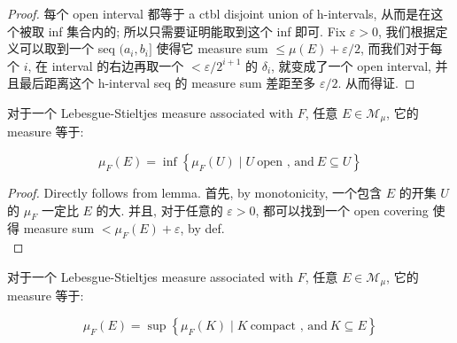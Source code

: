 \begin{proof}

每个 open interval 都等于 a ctbl disjoint union of h-intervals, 从而是在这个被取 inf 集合内的; 所以只需要证明能取到这个 inf 即可. Fix \(\varepsilon > 0\), 我们根据定义可以取到一个 seq \((a_{i},b_{i}\rbrack\) 使得它 measure sum \(\leq \mu(E) + \varepsilon/2\), 而我们对于每个 \(i\), 在 interval 的右边再取一个 \(< \varepsilon/2^{i + 1}\) 的 \(\delta_{i}\), 就变成了一个 open interval, 并且最后距离这个 h-interval seq 的 measure sum 差距至多 \(\varepsilon/2\). 从而得证.

\end{proof}

\begin{theorem}{}

对于一个 Lebesgue-Stieltjes measure associated with \(F\), 任意 \(E \in \mathcal{M}_{\mu}\), 它的 measure 等于:

\[\mu_{F}(E) = \inf\left\{ {\mu_{F}(U) \mid U\ \text{open , and}\ E \subseteq U} \right\}\]

\end{theorem}

\begin{proof}

Directly follows from lemma. 首先, by monotonicity, 一个包含 \(E\) 的开集 \(U\) 的 \(\mu_{F}\) 一定比 \(E\) 的大. 并且, 对于任意的 \(\varepsilon > 0\), 都可以找到一个 open covering 使得 measure sum \(< \mu_{F}(E) + \varepsilon\), by def.\\

\end{proof}

\begin{theorem}{}

对于一个 Lebesgue-Stieltjes measure associated with \(F\), 任意 \(E \in \mathcal{M}_{\mu}\), 它的 measure 等于:

\[\mu_{F}(E) = \sup\left\{ {\mu_{F}(K) \mid K\ \text{compact , and}\ K \subseteq E} \right\}\]

\end{theorem}

